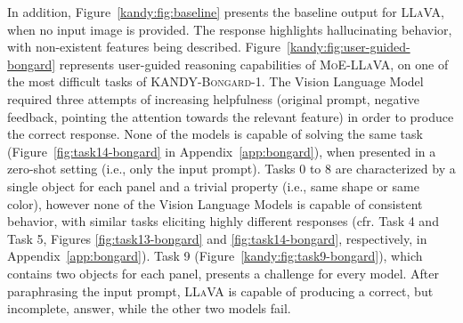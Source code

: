In addition, Figure~\ref{kandy:fig:baseline} presents the baseline output for \textsc{LLaVA}, when no input image is provided. The response highlights hallucinating behavior, with non-existent features being described. %
Figure~\ref{kandy:fig:user-guided-bongard} represents user-guided reasoning capabilities of \textsc{MoE-LLaVA}, on one of the most difficult tasks of \textsc{KANDY-Bongard-1}. The Vision Language Model required three attempts of increasing helpfulness (original prompt, negative feedback, pointing the attention towards the relevant feature) in order to produce the correct response.
None of the models is capable of solving the same task (Figure~\ref{fig:task14-bongard} in Appendix~\ref{app:bongard}), when presented in a zero-shot setting (i.e., only the input prompt).
Tasks 0 to 8 are characterized by a single object for each panel and a trivial property (i.e., same shape or same color), however none of the Vision Language Models is capable of consistent behavior, with similar tasks eliciting highly different responses (cfr. Task 4 and Task 5, Figures \ref{fig:task13-bongard} and \ref{fig:task14-bongard}, respectively, in Appendix~\ref{app:bongard}). 
Task 9 (Figure~\ref{kandy:fig:task9-bongard}), which contains two objects for each panel, presents a challenge for every model. After paraphrasing the input prompt, \textsc{LLaVA} is capable of producing a correct, but incomplete, answer, while the other two models fail.


